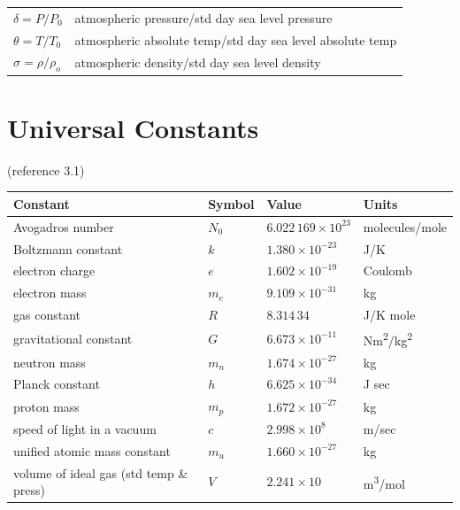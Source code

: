 \documentclass[
]{book}
\begin{document}
\begin{longtable}[]{@{}ll@{}}
\begin{minipage}[t]{0.21\columnwidth}
\(\delta = P/P_0\)\strut
\end{minipage} & \begin{minipage}[t]{0.73\columnwidth}\raggedright
atmospheric pressure/std day sea level pressure\strut
\end{minipage}\tabularnewline
\begin{minipage}[t]{0.21\columnwidth}\raggedright
\(\theta = T/T_0\)\strut
\end{minipage} & \begin{minipage}[t]{0.73\columnwidth}\raggedright
atmospheric absolute temp/std day sea level absolute temp\strut
\end{minipage}\tabularnewline
\begin{minipage}[t]{0.21\columnwidth}\raggedright
\(\sigma = \rho/\rho_ο\)\strut
\end{minipage} & \begin{minipage}[t]{0.73\columnwidth}\raggedright
atmospheric density/std day sea level density\strut
\end{minipage}\tabularnewline
\bottomrule
\end{longtable}

\hypertarget{universal-constants}{%
\section{Universal Constants}\label{universal-constants}}

(reference 3.1)

\begin{longtable}[]{@{}llll@{}}
\toprule
Constant & Symbol & Value & Units\tabularnewline
\midrule
\endhead
Avogadros number & \(N_0\) & \(6.022\,169 \times 10^{23}\) & molecules/mole\tabularnewline
Boltzmann constant & \(k\) & \(1.380 \times 10^{-23}\) & J/K\tabularnewline
electron charge & \(e\) & \(1.602 \times 10^{-19}\) & Coulomb\tabularnewline
electron mass & \(m_e\) & \(9.109 \times 10^{-31}\) & kg\tabularnewline
gas constant & \(R\) & \(8.314\,34\) & J/K mole\tabularnewline
gravitational constant & \(G\) & \(6.673 \times 10^{-11}\) & Nm\textsuperscript{2}/kg\textsuperscript{2}\tabularnewline
neutron mass & \(m_n\) & \(1.674 \times 10^{-27}\) & kg\tabularnewline
Planck constant & \(h\) & \(6.625 \times 10^{-34}\) & J sec\tabularnewline
proton mass & \(m_p\) & \(1.672 \times 10^{-27}\) & kg\tabularnewline
speed of light in a vacuum & \(c\) & \(2.998 \times 10^8\) & m/sec\tabularnewline
unified atomic mass constant & \(m_u\) & \(1.660 \times 10^{-27}\) & kg\tabularnewline
volume of ideal gas (std temp \& press) & \(V\) & \(2.241 \times 10\) & m\textsuperscript{3}/mol\tabularnewline
\bottomrule
\end{longtable}
\end{document}
